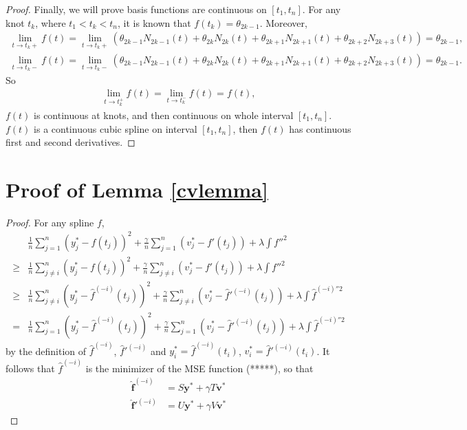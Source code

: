 \begin{proof}
Finally, we will prove basis functions are continuous on $[t_1, t_n]$. For any knot $t_k$, where $t_1< t_k <t_n$, it is known that $f(t_k)=\theta_{2k-1}$. Moreover, 
\begin{align*}
\lim\limits_{t\rightarrow t_k+} f(t) = \lim\limits_{t\rightarrow t_k+} (\theta_{2k-1}N_{2k-1}(t)+\theta_{2k}N_{2k}(t)+\theta_{2k+1}N_{2k+1}(t)+\theta_{2k+2}N_{2k+3}(t))=\theta_{2k-1},\\
\lim\limits_{t\rightarrow t_k-} f(t) = \lim\limits_{t\rightarrow t_k-} (\theta_{2k-1}N_{2k-1}(t)+\theta_{2k}N_{2k}(t)+\theta_{2k+1}N_{2k+1}(t)+\theta_{2k+2}N_{2k+3}(t))=\theta_{2k-1}.
\end{align*}
So
\begin{align*}
\lim\limits_{t\rightarrow t_k^+} f(t) =\lim\limits_{t\rightarrow t_k^-} f(t) =f(t),
\end{align*}
$f(t)$ is continuous at knots, and then continuous on whole interval $[t_1,t_n]$.
$f(t)$ is a continuous cubic spline on interval $[t_1,t_n]$, then $f(t)$ has continuous first and second derivatives.
\end{proof}

\section{Proof of Lemma \ref{cvlemma}}
\begin{proof}
For any spline $f$, 
\begin{equation}
\begin{split}
&\frac{1}{n}\sum_{j=1}^{n}(y_j^*-f(t_j))^2+\frac{\gamma}{n} \sum_{j=1}^{n}(v_j^*-f'(t_j))+\lambda\int f''^2 \\
\geq&\frac{1}{n}\sum_{j\neq i}^{n}(y_j^*-f(t_j))^2+\frac{\gamma}{n} \sum_{j\neq i}^{n}(v_j^*-f'(t_j))+\lambda\int f''^2\\
\geq&\frac{1}{n}\sum_{j\neq i}^{n}(y_j^*-\hat{f}^{(-i)}(t_j))^2+\frac{\gamma}{n} \sum_{j\neq i}^{n}(v_j^*-\hat{f}'^{(-i)}(t_j))+\lambda\int \hat{f}^{(-i)''2}\\
=&\frac{1}{n}\sum_{j=1}^{n}(y_j^*-\hat{f}^{(-i)}(t_j))^2+\frac{\gamma}{n} \sum_{j=1}^{n}(v_j^*-\hat{f}'^{(-i)}(t_j))+\lambda\int \hat{f}^{(-i)''2}
\end{split}
\end{equation}
by the definition of $\hat{f}^{(-i)}$, $\hat{f}'^{(-i)}$ and $y_i^*=\hat{f}^{(-i)}(t_i)$, $v_i^*=\hat{f}'^{(-i)}(t_i)$. It follows that $\hat{f}^{(-i)}$ is the minimizer of the MSE function (*****), so that
\begin{align}
\mathbf{\hat{f}}^{(-i)}&=S\mathbf{y}^*+\gamma T\mathbf{v}^*\\
\mathbf{\hat{f}}'^{(-i)}&=U\mathbf{y}^*+\gamma V\mathbf{v}^*
\end{align}
\end{proof}


